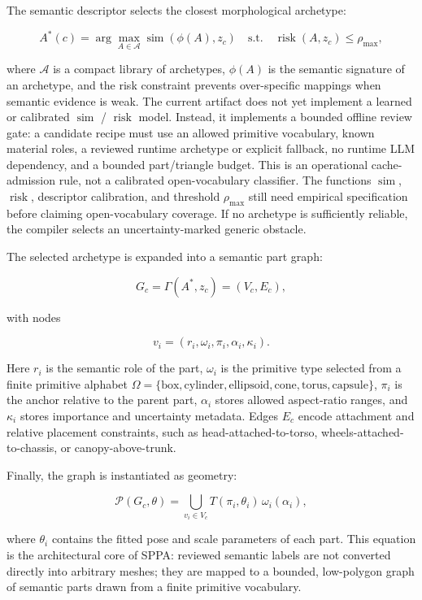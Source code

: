 ﻿\documentclass[11pt,a4paper]{article}
\begin{document}
The semantic descriptor selects the closest morphological archetype:

\[
A^*(c) =
\arg\max_{A \in \mathcal{A}}
\operatorname{sim}\!\left(\phi(A), z_c\right)
\quad
\text{s.t.}\quad
\operatorname{risk}(A,z_c) \leq \rho_{\max},
\]

where \(\mathcal{A}\) is a compact library of archetypes, \(\phi(A)\) is the
semantic signature of an archetype, and the risk constraint prevents
over-specific mappings when semantic evidence is weak. The current artifact does
not yet implement a learned or calibrated \(\operatorname{sim}\) /
\(\operatorname{risk}\) model. Instead, it implements a bounded offline
review gate: a candidate recipe must use an allowed primitive vocabulary, known
material roles, a reviewed runtime archetype or explicit fallback, no runtime
LLM dependency, and a bounded part/triangle budget. This is an operational
cache-admission rule, not a calibrated open-vocabulary classifier. The functions
\(\operatorname{sim}\), \(\operatorname{risk}\), descriptor calibration, and
threshold \(\rho_{\max}\) still need empirical specification before claiming
open-vocabulary coverage. If no archetype is sufficiently reliable, the compiler
selects an uncertainty-marked generic obstacle.

The selected archetype is expanded into a semantic part graph:

\[
G_c = \Gamma(A^*, z_c) = (V_c, E_c),
\]

with nodes

\[
v_i =
\left(r_i, \omega_i, \pi_i, \alpha_i, \kappa_i\right).
\]

Here \(r_i\) is the semantic role of the part, \(\omega_i\) is the primitive
type selected from a finite primitive alphabet
\(\Omega=\{\text{box},\text{cylinder},\text{ellipsoid},\text{cone},
\text{torus},\text{capsule}\}\), \(\pi_i\) is the anchor relative to the parent
part, \(\alpha_i\) stores allowed aspect-ratio ranges, and \(\kappa_i\) stores
importance and uncertainty metadata. Edges \(E_c\) encode attachment and
relative placement constraints, such as head-attached-to-torso,
wheels-attached-to-chassis, or canopy-above-trunk.

Finally, the graph is instantiated as geometry:

\[
\mathcal{P}(G_c,\theta) =
\bigcup_{v_i \in V_c}
T(\pi_i,\theta_i)\,\omega_i(\alpha_i),
\]

where \(\theta_i\) contains the fitted pose and scale parameters of each part.
This equation is the architectural core of SPPA: reviewed semantic labels are
not converted directly into arbitrary meshes; they are mapped to a bounded,
low-polygon graph of semantic parts drawn from a finite primitive vocabulary.
\end{document}
